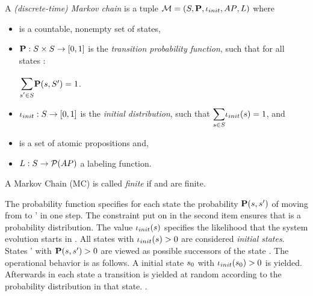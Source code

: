 \documentclass[preview]{standalone}
\begin{document}
\begin{definition}
	A \emph{(discrete-time) Markov chain} is a tuple ${\mathcal{M}} = ({S}, {\textbf{P}}, {\iota_{init}}, {AP}, {L})$ where 
	\begin{itemize}
		\item \states is a countable, nonempty set of states,
		\item ${\textbf{P}} : {S} \times {S} \to [0,1]$ is the \emph{transition probability function}, such that for all states \state:
		\begin{center}
			$\bbigsum{\state' \in \states}\probtfunc(\state,\states') = 1$.	
		\end{center}
		\item ${\iota_{init}} : {S} \to [0,1]$ is the \emph{initial distribution}, such that $\mathlarger{\sum_{\state \in \states}} \initdistrib(\state) = 1$, and
		\item \atomicprops is a set of atomic propositions and,
		\item ${L} : {S} \to {\mathcal{P}(\ensuremath{{AP}})}$ a labeling function.		
	\end{itemize}
\end{definition}

A Markov Chain (MC) \autm is called \emph{finite} if \states and \atomicprops are finite. 


The probability function \probtfunc specifies for each state \state the probability ${\textbf{P}}({s},{s}')$ of moving from \state to \state' in one step. The constraint put on \probtfunc in the second item ensures that \probtfunc is a probability distribution. The value ${\iota_{init}}({s})$ specifies the likelihood that the system evolution starts in \state. All states \state with ${\iota_{init}}({s}) > 0$ are  considered \emph{initial states}. States \state' with ${\textbf{P}}({s}, {s}') > 0$ are viewed as possible successors of the state \state. The operational behavior is as follows. A initial state ${s}_0$ with ${\iota_{init}}({s}_0) > 0$ is yielded. Afterwards in each state a transition is yielded at random according to the probability distribution \probtfunc in that state. .
\end{document}
